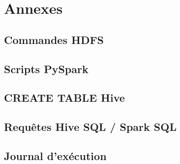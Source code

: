 \chapter{Annexes}
\section{Commandes HDFS}
\section{Scripts PySpark}
\section{CREATE TABLE Hive}
\section{Requêtes Hive SQL / Spark SQL}
\section{Journal d'exécution}

